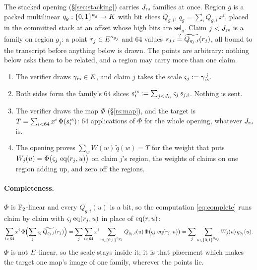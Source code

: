 The stacked opening (\S\ref{sec:stacking}) carries $J_{\mathrm{rs}}$ families at once. Region $g$ is a packed multilinear $q_g:\{0,1\}^{\kappa_g}\to K$ with bit slices $Q_{g,i}$, $q_g=\sum_iQ_{g,i}\,x^i$, placed in the committed stack at an offset whose high bits are $\mathsf{sel}_g$. Claim $j<J_{\mathrm{rs}}$ is a family on region $g_j$: a point $r_j\in E^{\kappa_{g_j}}$ and $64$ values $s_{j,i}\stackrel{?}{=}\widetilde{Q_{g_j,i}}(r_j)$, all bound to the transcript before anything below is drawn. The points are arbitrary: nothing below asks them to be related, and a region may carry more than one claim.

\begin{enumerate}
\item The verifier draws $\gamma_{\mathrm{rs}}\in E$, and claim $j$ takes the scale $\varsigma_j:=\gamma_{\mathrm{rs}}^{\,j}$.
\item Both sides form the family's $64$ slices $s^{\mathrm{rs}}_{i}:=\sum_{j<J_{\mathrm{rs}}}\varsigma_j\,s_{j,i}$. Nothing is sent.
\item The verifier draws the map $\Phi$ (\S\ref{rs:map}), and the target is $T=\sum_{i<64}x^i\,\Phi(s^{\mathrm{rs}}_{i})$: $64$ applications of $\Phi$ for the whole opening, whatever $J_{\mathrm{rs}}$ is.
\item The opening proves $\sum_wW(w)\,\widetilde q(w)=T$ for the weight that puts $W_j(u)=\Phi\bigl(\varsigma_j\,\operatorname{eq}(r_j,u)\bigr)$ on claim $j$'s region, the weights of claims on one region adding up, and zero off the regions.
\end{enumerate}

\paragraph{Completeness.} $\Phi$ is $\mathbb{F}_2$-linear and every $Q_{g,i}(u)$ is a bit, so the computation \eqref{eq:complete} runs claim by claim with $\varsigma_j\operatorname{eq}(r_j,u)$ in place of $\operatorname{eq}(r,u)$:
\[
\sum_{i<64}x^i\,\Phi\Bigl(\sum_j\varsigma_j\,\widetilde{Q_{g_j,i}}(r_j)\Bigr)
=\sum_j\sum_{i<64}x^i\sum_{u\in\{0,1\}^{\kappa_{g_j}}}Q_{g_j,i}(u)\,\Phi\bigl(\varsigma_j\,\operatorname{eq}(r_j,u)\bigr)
=\sum_j\sum_{u\in\{0,1\}^{\kappa_{g_j}}}W_j(u)\,q_{g_j}(u).
\]
$\Phi$ is not $E$-linear, so the scale stays inside it; it is that placement which makes the target one map's image of one family, wherever the points lie.

